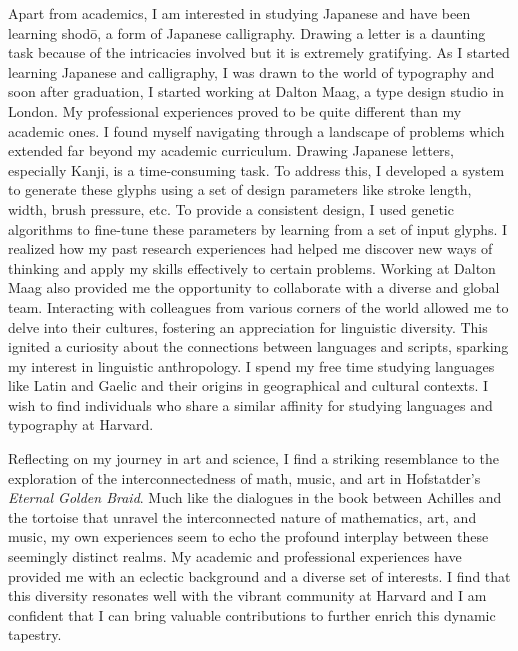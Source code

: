 \documentclass[12pt]{article}
\begin{document}
Apart from academics, I am interested in studying Japanese and have been
learning shodō, a form of Japanese calligraphy. Drawing a letter is a daunting
task because of the intricacies involved but it is extremely gratifying. As I
started learning Japanese and calligraphy, I was drawn to the world of
typography and soon after graduation, I started working at Dalton Maag, a type
design studio in London. My professional experiences proved to be quite
different than my academic ones. I found myself navigating through a landscape
of problems which extended far beyond my academic curriculum. Drawing Japanese
letters, especially Kanji, is a time-consuming task. To address this, I
developed a system to generate these glyphs using a set of design parameters
like stroke length, width, brush pressure, etc. To provide a consistent design,
I used genetic algorithms to fine-tune these parameters by learning from a set
of input glyphs. I realized how my past research experiences had helped me
discover new ways of thinking and apply my skills effectively to certain
problems. Working at Dalton Maag also provided me the opportunity to collaborate
with a diverse and global team. Interacting with colleagues from various corners
of the world allowed me to delve into their cultures, fostering an appreciation
for linguistic diversity. This ignited a curiosity about the connections between
languages and scripts, sparking my interest in linguistic anthropology. I spend
my free time studying languages like Latin and Gaelic and their origins in
geographical and cultural contexts. I wish to find individuals who share a
similar affinity for studying languages and typography at Harvard.

Reflecting on my journey in art and science, I find a striking resemblance to
the exploration of the interconnectedness of math, music, and art in
Hofstatder’s \textit{Eternal Golden Braid}. Much like the dialogues in the book between
Achilles and the tortoise that unravel the interconnected nature of mathematics,
art, and music, my own experiences seem to echo the profound interplay between
these seemingly distinct realms. My academic and professional experiences have
provided me with an eclectic background and a diverse set of interests. I find
that this diversity resonates well with the vibrant community at Harvard and I am
confident that I can bring valuable contributions to further enrich this dynamic
tapestry.
\end{document}
